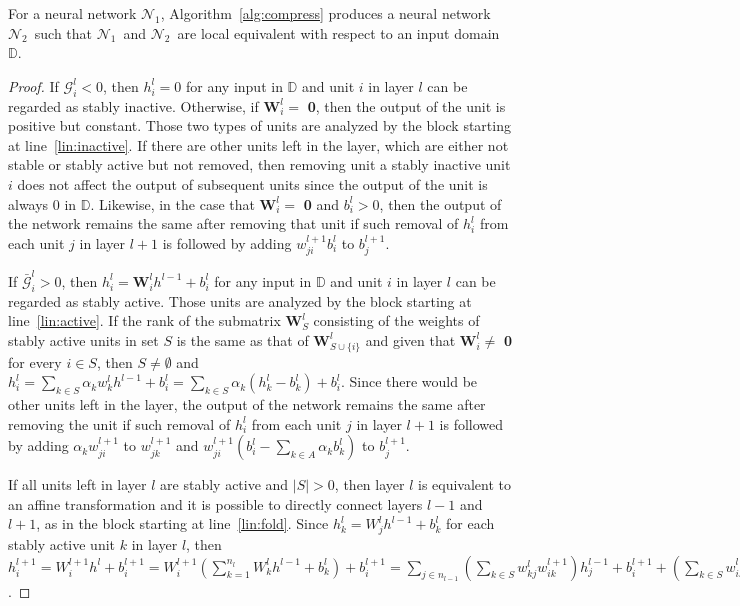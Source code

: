 \documentclass[runningheads]{llncs}
\def\mW{{\bm{W}}}
\def\sD{{\mathbb{D}}}
\newcommand{\dnnone}{$\mathcal{N}_1$}
\newcommand{\dnntwo}{$\mathcal{N}_2$}
\begin{document}
    \begin{theorem}\label{th:1}
    For a neural network \dnnone, Algorithm~\ref{alg:compress} produces a neural network \dnntwo~such that \dnnone~and \dnntwo~are local equivalent with respect to an input domain $\sD$. 
    \end{theorem}
    \begin{proof}
        If $\mathcal{G}_i^l < 0$, then $h^l_i = 0$ for any input in $\sD$ and unit $i$ in layer $l$ can be regarded as stably inactive. Otherwise, if $\mW_i^l =$ \textbf{0}, then the output of the unit is positive but constant. Those two types of units are analyzed by the block starting at line~\ref{lin:inactive}.  If there are other units left in the layer, which are either not stable or stably active but not removed, then removing unit a stably inactive unit $i$ does not affect the output of subsequent units since the output of the unit is always 0 in $\sD$. Likewise, in the case that $\mW_i^l =$ \textbf{0} and $b^l_i > 0$, then 
        the output of the network remains the same after removing that unit if such removal of $h_i^l$ from  each unit $j$ in layer $l+1$ is followed by adding
        $w^{l+1}_{ji} b^l_i$ to $b_j^{l+1}$.
        
        
        If $\bar{\mathcal{G}}_i^l > 0$, then $h_i^l = \mW^l_i h^{l-1} + b_i^l$ for any input in $\sD$ and unit $i$ in layer $l$ can be regarded as stably active. Those units are analyzed by the block starting at line~\ref{lin:active}. If the rank of the submatrix $\mW^l_S$ consisting of the weights of stably active units in set $S$ is the same as that of $\mW^l_{S \cup \{i\}}$ and given that $\mW_i^l \neq$ \textbf{0} for every $i \in S$, then $S \neq \emptyset$ and $h^l_i = \sum\limits_{k \in S} \alpha_k w_k^l h^{l-1} + b_i^l = \sum\limits_{k \in S} \alpha_k (h^l_k - b^l_k) + b_i^l$. Since there would be other units left in the layer, the output of the network remains the same after removing the unit if such removal of $h^l_i$ from  each unit $j$ in layer $l+1$ is followed by adding $\alpha_k w^{l+1}_{ji}$ to $w^{l+1}_{jk}$ and $w^{l+1}_{ji} \left( b_i^l - \sum\limits_{k \in A} \alpha_k b^l_k \right)$ to $b_j^{l+1}$. 


        If all units left in layer $l$ are stably active and $|S|>0$, 
        then layer $l$ is equivalent to an affine transformation and it is possible to directly connect layers $l-1$ and $l+1$,   
as in 
the block starting at line~\ref{lin:fold}. 
        Since $h^l_k = W^l_j h^{l-1} + b^l_k$ for each stably active unit $k$ in layer $l$, 
        then $h^{l+1}_i = W^{l+1}_i h^l + b^{l+1}_i =  W^{l+1}_i \left( \sum\limits_{k=1}^{n_l} W^l_k h^{l-1} + b^l_k \right) + b^{l+1}_i = \sum\limits_{j \in n_{l-1}} \left( \sum\limits_{k \in S} w^l_{kj} w^{l+1}_{ik} \right) h^{l-1}_j + b^{l+1}_i + \left( \sum\limits_{k \in S} w^{l+1}_{ik} b^l_k \right)$.
        

\end{proof}
\end{document}
